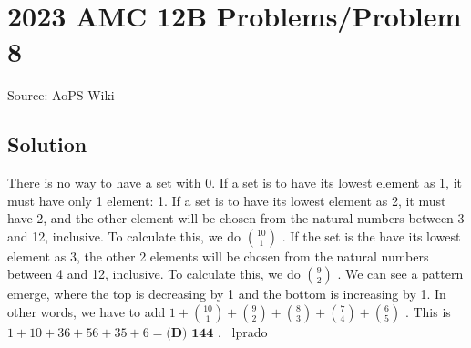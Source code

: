 \documentclass[12pt]{article}
\begin{document}
\section*{{2023 AMC 12B Problems/Problem 8}}
Source: AoPS Wiki

\subsection*{Solution}
There is no way to have a set with 0. If a set is to have its lowest element as 1, it must have only 1 element: 1. If a set is to have its lowest element as 2, it must have 2, and the other element will be chosen from the natural numbers between 3 and 12, inclusive. To calculate this, we do $\binom{10}{1}$ . If the set is the have its lowest element as 3, the other 2 elements will be chosen from the natural numbers between 4 and 12, inclusive. To calculate this, we do $\binom{9}{2}$ . We can see a pattern emerge, where the top is decreasing by 1 and the bottom is increasing by 1. In other words, we have to add $1 + \binom{10}{1} + \binom{9}{2} + \binom{8}{3} + \binom{7}{4} + \binom{6}{5}$ . This is $1+10+36+56+35+6 = \boxed{\textbf{(D) 144}}$ . ~lprado
\end{document}
